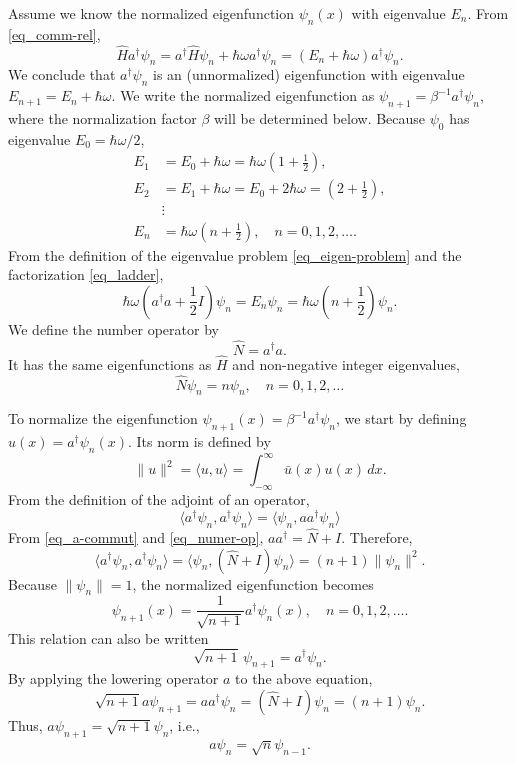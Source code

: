 \documentclass[11pt]{article}
\begin{document}
Assume we know the normalized eigenfunction $\psi_n(x)$ with eigenvalue $E_n$. From
\eqref{eq_comm-rel},
\[
\hat{H} a^\dag\psi_n = a^\dag \hat{H} \psi_n + \hbar\omega a^\dag \psi_n = (E_n + \hbar\omega)
a^\dag \psi_n.
\]
We conclude that $a^\dag\psi_n$ is an (unnormalized) eigenfunction with
eigenvalue $E_{n+1} = E_n + \hbar\omega$. We write the normalized eigenfunction as
$\psi_{n+1} = \beta^{-1} a^\dag \psi_n$, where the normalization factor $\beta$ will be determined below.
Because $\psi_0$ has eigenvalue $E_0 = \hbar\omega/2$,
\begin{align*}
  E_1 &= E_0 + \hbar\omega = \hbar\omega\left( 1+\frac{1}{2} \right),\\
  E_2 &= E_1 + \hbar\omega = E_0 + 2\hbar\omega = \left( 2 + \frac{1}{2} \right),\\
  &\vdots\\
  E_n &= \hbar\omega\left( n + \frac{1}{2} \right),\quad n=0,1,2,\ldots.
\end{align*}
From the definition of the eigenvalue problem \eqref{eq_eigen-problem} and the factorization
\eqref{eq_ladder},
\[
\hbar\omega\left( a^\dag a + \frac{1}{2}I \right)\psi_n = E_n \psi_n = \hbar\omega\left( n +
\frac{1}{2} \right)\psi_n. 
\]
We define the number operator by
\begin{equation}\label{eq_numer-op}
\hat{N} = a^\dag a.
\end{equation}
It has the same eigenfunctions as $\hat{H}$ and non-negative integer eigenvalues,
\[
\hat{N}\psi_n = n \psi_n,\quad n=0,1,2,\ldots
\]

To normalize the eigenfunction $\psi_{n+1}(x) = \beta^{-1} a^\dag \psi_n$, we start by defining $u(x) =
a^\dag\psi_n(x)$. Its norm is defined by
\[
\| u \|^2 = \langle u, u \rangle = \int_{-\infty}^\infty \bar{u}(x) u(x)\, dx.
\]
From the definition of the adjoint of an operator,
\[
\langle a^\dag\psi_n, a^\dag\psi_n\rangle = \langle \psi_n, a a^\dag \psi_n \rangle
\]
From \eqref{eq_a-commut} and \eqref{eq_numer-op}, $a a^\dag = \hat{N} + I$. Therefore,
\[
\langle a^\dag\psi_n, a^\dag\psi_n\rangle = \langle \psi_n, (\hat{N}+I)\psi_n \rangle = (n+1) \| \psi_n \|^2.
\]
Because $\| \psi_n \|=1$, the normalized eigenfunction becomes
\begin{equation}\label{eq_eigenfunction-recursive}
\psi_{n+1}(x) = \frac{1}{\sqrt{n+1}} a^\dag\psi_n(x),\quad n=0,1,2,\ldots.
\end{equation}
This relation can also be written
\[
\sqrt{n+1}\, \psi_{n+1} = a^\dag \psi_n.
\]
By applying the lowering operator $a$ to the above equation,
\[
\sqrt{n+1} a\psi_{n+1} = a a^\dag \psi_n = (\hat{N}+I) \psi_n = (n+1) \psi_n.
\]
Thus, $a \psi_{n+1} = \sqrt{n+1} \psi_n$, i.e.,
\[
a \psi_n = \sqrt{n} \psi_{n-1}.
\]
\end{document}
